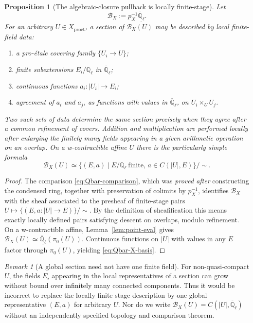 \documentclass[11pt,a4paper]{article}
\numberwithin{equation}{section}
\newtheorem{proposition}[theorem]{Proposition}
\theoremstyle{definition}
\theoremstyle{remark}
\newtheorem{remark}[theorem]{Remark}
\newcommand{\proet}{\mathrm{pro\acute{e}t}}
\newcommand{\ringunder}[1]{\underline{#1}}
\newcommand{\Qlbar}{\overline{\mathbb Q}_{\ell}}
\begin{document}
\begin{proposition}[The algebraic-closure pullback is locally finite-stage]
\label{prop:Qbar-X}
Let
\[
                    \mathcal B_X:=p_X^{-1}\ringunder{\Qlbar}.
\]
For an arbitrary $U\in X_{\proet}$, a section of $\mathcal B_X(U)$
may be described by \emph{local finite-field data}:
\begin{enumerate}
 \item a pro-\'{e}tale covering family $\{U_i\to U\}$;
 \item finite subextensions $E_i/\mathbb Q_\ell$ in $\Qlbar$;
 \item continuous functions $a_i:|U_i|\to E_i$;
 \item agreement of $a_i$ and $a_j$, as functions with values in
       $\Qlbar$, on $U_i\times_U U_j$.
\end{enumerate}
Two such sets of data determine the same section precisely when they
agree after a common refinement of covers.  Addition and
multiplication are performed locally after enlarging the finitely
many fields appearing in a given arithmetic operation on an overlap.
On a w-contractible affine $U$ there is the particularly simple formula
\begin{equation}\label{eq:Qbar-X-basis}
 \boxed{\quad
 \mathcal B_X(U)\simeq
  \{(E,a)\mid E/\mathbb Q_\ell\ \mathrm{finite},\,
                a\in C(|U|,E)\}/{\sim}.
 \quad}
\end{equation}
\end{proposition}
\begin{proof}
The comparison \eqref{eq:Qbar-comparison}, which was \emph{proved after}
constructing the condensed ring, together with preservation of
colimits by $p_X^{-1}$, identifies $\mathcal B_X$ with the sheaf
associated to the presheaf of finite-stage pairs
$U\mapsto\{(E,a:|U|\to E)\}/{\sim}$.  By the definition of
sheafification this means exactly locally defined pairs satisfying
descent on overlaps, modulo refinement.  On a w-contractible affine,
Lemma~\ref{lem:point-eval} gives
$\mathcal B_X(U)\simeq\ringunder{\Qlbar}(\pi_0(U))$.
Continuous functions on $|U|$ with values in any $E$ factor through
$\pi_0(U)$, yielding \eqref{eq:Qbar-X-basis}.
\end{proof}

\begin{remark}[A global section need not have one finite field]
For non-quasi-compact $U$, the fields $E_i$ appearing in the local
representatives of a section can grow without bound over infinitely
many connected components.  Thus it would be incorrect to replace
the locally finite-stage description by one global representative
$(E,a)$ for arbitrary $U$.  Nor do we write
$\mathcal B_X(U)=C(|U|,\Qlbar)$ without an independently specified
topology and comparison theorem.
\end{remark}
\end{document}
